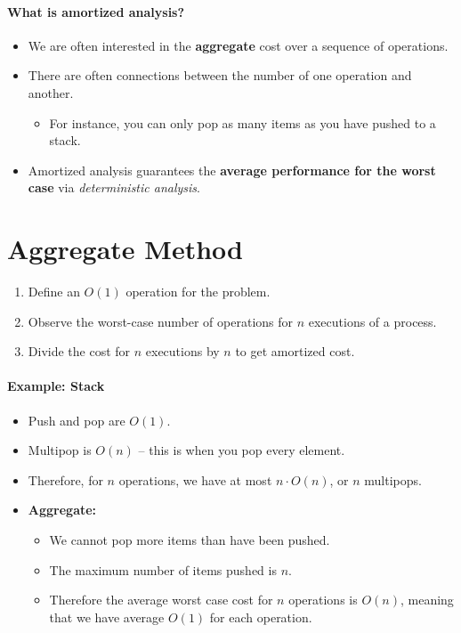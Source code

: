 \documentclass[a4paper,12pt]{report}
\begin{document}
\paragraph{What is amortized analysis? } 
\begin{itemize}
\item We are often interested in the \textbf{aggregate} cost over a sequence of operations.
\item There are often connections between the number of one operation and another. 
\begin{itemize}
\item For instance, you can only pop as many items as you have pushed to a stack. 
\end{itemize}
\item Amortized analysis guarantees the \textbf{average performance for the worst case} via \textit{deterministic analysis}. 
\end{itemize}


\section{Aggregate Method}
\begin{enumerate}
\item Define an $O(1)$ operation for the problem.
\item Observe the worst-case number of operations for $n$ executions of a process.
\item Divide the cost for $n$ executions by $n$ to get amortized cost.
\end{enumerate}


\paragraph{Example: Stack } 
\begin{itemize}
\item Push and pop are $O(1)$.
\item Multipop is $O(n)$ -- this is when you pop every element. 
\item Therefore, for $n$ operations, we have at most $n\cdot O(n)$, or $n$ multipops.
\item \textbf{Aggregate:} 
\begin{itemize}
\item We cannot pop more items than have been pushed.
\item The maximum number of items pushed is $n$. 
\item Therefore the average worst case cost for $n$ operations is $O(n)$, meaning that we have average $O(1)$ for each operation.
\end{itemize}
\end{itemize}
\end{document}
